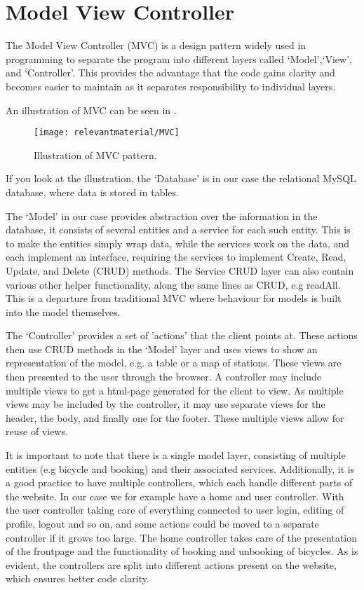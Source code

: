 \section{Model View Controller}\label{sec:mvc}
The Model View Controller (MVC) is a design pattern widely used in programming to separate the program into different layers called `Model',`View', and `Controller'.
This provides the advantage that the code gains clarity and becomes easier to maintain as it separates responsibility to individual layers.

An illustration of MVC can be seen in .
\begin{figure}[h]
	\centering
	\texttt{[image: relevantmaterial/MVC]}
	\caption{Illustration of MVC pattern.}\label{fig:MVC}
\end{figure}

If you look at the illustration, the `Database' is in our case the relational MySQL database, where data is stored in tables.

The `Model' in our case provides abstraction over the information in the database, it consists of several entities and a service for each such entity.
This is to make the entities simply wrap data, while the services work on the data, and each implement an interface, requiring the services to implement Create, Read, Update, and Delete (CRUD) methods. The Service CRUD layer can also contain various other helper functionality, along the same lines as CRUD, e.g readAll. 
This is a departure from traditional MVC where behaviour for models is built into the model themselves.

The `Controller' provides a set of 'actions' that the client points at. 
These actions then use CRUD methods in the `Model' layer and uses views to show an representation of the model, e.g. a table or a map of stations. 
These views are then presented to the user through the browser.
A controller may include multiple views to get a html-page generated for the client to view.
As multiple views may be included by the controller, it may use separate views for the header, the body, and finally one for the footer. 
These multiple views allow for reuse of views.

It is important to note that there is a single model layer, consisting of multiple entities (e.g bicycle and booking) and their associated services.
Additionally, it is a good practice to have multiple controllers, which each handle different parts of the website.
In our case we for example have a home and user controller.
With the user controller taking care of everything connected to user login, editing of profile, logout and so on, and some actions could be moved to a separate controller if it grows too large.
The home controller takes care of the presentation of the frontpage and the functionality of booking and unbooking of bicycles.
As is evident, the controllers are split into different actions present on the website, which ensures better code clarity.


